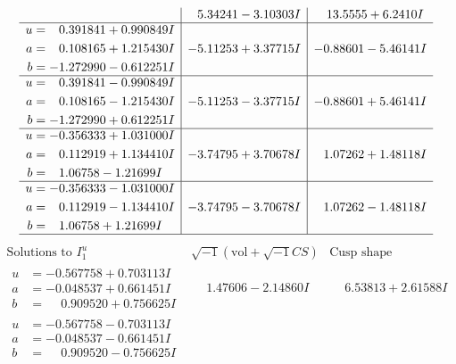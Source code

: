 \documentclass[1p]{elsarticle_modified}
\theoremstyle{definition}
\newcommand{\I}{\sqrt{-1}}
\begin{document}
$$\begin{array}{c|c|c}
 & \phantom{-}5.34241 - 3.10303 I & \phantom{-}13.5555 + 6.2410 I \\ \hline\begin{aligned}
u &= \phantom{-}0.391841 + 0.990849 I \\
a &= \phantom{-}0.108165 + 1.215430 I \\
b &= -1.272990 - 0.612251 I\end{aligned}
 & -5.11253 + 3.37715 I & -0.88601 - 5.46141 I \\ \hline\begin{aligned}
u &= \phantom{-}0.391841 - 0.990849 I \\
a &= \phantom{-}0.108165 - 1.215430 I \\
b &= -1.272990 + 0.612251 I\end{aligned}
 & -5.11253 - 3.37715 I & -0.88601 + 5.46141 I \\ \hline\begin{aligned}
u &= -0.356333 + 1.031000 I \\
a &= \phantom{-}0.112919 + 1.134410 I \\
b &= \phantom{-}1.06758 - 1.21699 I\end{aligned}
 & -3.74795 + 3.70678 I & \phantom{-}1.07262 + 1.48118 I \\ \hline\begin{aligned}
u &= -0.356333 - 1.031000 I \\
a &= \phantom{-}0.112919 - 1.134410 I \\
b &= \phantom{-}1.06758 + 1.21699 I\end{aligned}
 & -3.74795 - 3.70678 I & \phantom{-}1.07262 - 1.48118 I\\
 \hline 
 \end{array}$$\newpage$$\begin{array}{c|c|c}  
\text{Solutions to }I^u_{1}& \I (\text{vol} + \sqrt{-1}CS) & \text{Cusp shape}\\
 \hline 
\begin{aligned}
u &= -0.567758 + 0.703113 I \\
a &= -0.048537 + 0.661451 I \\
b &= \phantom{-}0.909520 + 0.756625 I\end{aligned}
 & \phantom{-}1.47606 - 2.14860 I & \phantom{-}6.53813 + 2.61588 I \\ \hline\begin{aligned}
u &= -0.567758 - 0.703113 I \\
a &= -0.048537 - 0.661451 I \\
b &= \phantom{-}0.909520 - 0.756625 I\end{aligned}

\end{array}$$
\end{document}
